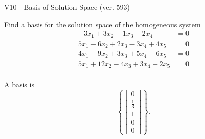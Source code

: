 \begin{exercise}
  \begin{exerciseTitle}V10 - Basis of Solution Space (ver. 593)\end{exerciseTitle}
  \begin{exerciseStatement}
    Find a basis for the solution space of the homogeneous system 
\begin{align*}
 -3 x_ 1 + 3 x_ 2 -1 x_ 3 -2 x_ 4 &= 0  \\ 
  5 x_ 1 -6 x_ 2 + 2 x_ 3 -3 x_ 4 + 4 x_ 5 &= 0  \\ 
  4 x_ 1 -9 x_ 2 + 3 x_ 3 + 5 x_ 4 -6 x_ 5 &= 0  \\ 
  5 x_ 1 + 12 x_ 2 -4 x_ 3 + 3 x_ 4 -2 x_ 5 &= 0  \\ 
 \end{align*}


 
  \end{exerciseStatement}

  \begin{exerciseAnswer}
   A basis is   
\[\left\{\left[\begin{array}{c}
0 \\
\frac{1}{3} \\
1 \\
0 \\
0
\end{array}\right]\right\}.\]

  


  \end{exerciseAnswer}
\end{exercise}